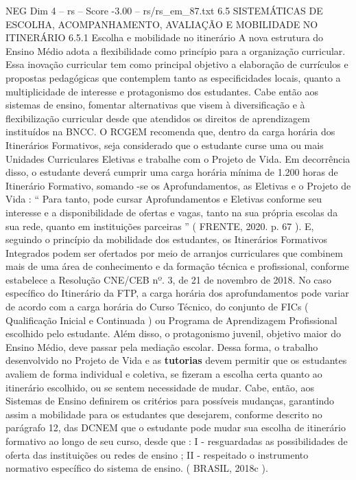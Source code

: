 \begin{textsample}{NEG Dim 4 – rs – Score -3.00 – rs/rs\_em\_87.txt}  \label{ex:f4_neg_192}
6.5 SISTEMÁTICAS DE ESCOLHA, ACOMPANHAMENTO, AVALIAÇÃO E MOBILIDADE NO ITINERÁRIO 6.5.1 Escolha e mobilidade no itinerário A nova estrutura do Ensino Médio adota a flexibilidade como princípio para a organização curricular.
Essa inovação curricular tem como principal objetivo a elaboração de currículos e propostas pedagógicas que contemplem tanto as especificidades locais, quanto a multiplicidade de interesse e protagonismo dos estudantes.
Cabe então aos sistemas de ensino, fomentar alternativas que visem à diversificação e à flexibilização curricular desde que atendidos os direitos de aprendizagem instituídos na BNCC.
O RCGEM recomenda que, dentro da carga horária dos Itinerários Formativos, seja considerado que o estudante curse uma ou mais Unidades Curriculares Eletivas e trabalhe com o Projeto de Vida.
Em decorrência disso, o estudante deverá cumprir uma carga horária mínima de 1.200 horas de Itinerário Formativo, somando -se os Aprofundamentos, as Eletivas e o Projeto de Vida : “ Para tanto, pode cursar Aprofundamentos e Eletivas conforme seu interesse e a disponibilidade de ofertas e vagas, tanto na sua própria escolas da sua rede, quanto em instituições parceiras ” ( FRENTE, 2020. p. 67 ).
E, seguindo o princípio da mobilidade dos estudantes, os Itinerários Formativos Integrados podem ser ofertados por meio de arranjos curriculares que combinem mais de uma área de conhecimento e da formação técnica e profissional, conforme estabelece a Resolução CNE/CEB nº. 3, de 21 de novembro de 2018.
No caso específico do Itinerário da FTP, a carga horária dos aprofundamentos pode variar de acordo com a carga horária do Curso Técnico, do conjunto de FICs ( Qualificação Inicial e Continuada ) ou Programa de Aprendizagem Profissional escolhido pelo estudante.
Além disso, o protagonismo juvenil, objetivo maior do Ensino Médio, deve passar pela mediação escolar.
Dessa forma, o trabalho desenvolvido no Projeto de Vida e as \textbf{tutorias} devem permitir que os estudantes avaliem de forma individual e coletiva, se fizeram a escolha certa quanto ao itinerário escolhido, ou se sentem necessidade de mudar.
Cabe, então, aos Sistemas de Ensino definirem os critérios para possíveis mudanças, garantindo assim a mobilidade para os estudantes que desejarem, conforme descrito no parágrafo 12, das DCNEM que o estudante pode mudar sua escolha de itinerário formativo ao longo de seu curso, desde que : I - resguardadas as possibilidades de oferta das instituições ou redes de ensino ; II - respeitado o instrumento normativo específico do sistema de ensino. ( BRASIL, 2018c ).

\end{textsample}
